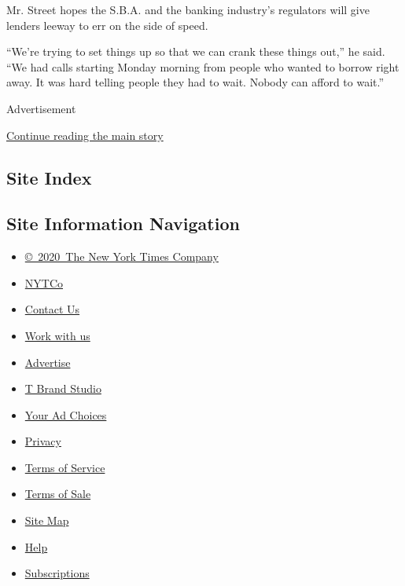 Mr. Street hopes the S.B.A. and the banking industry's regulators will
give lenders leeway to err on the side of speed.

``We're trying to set things up so that we can crank these things out,''
he said. ``We had calls starting Monday morning from people who wanted
to borrow right away. It was hard telling people they had to wait.
Nobody can afford to wait.''

Advertisement

\protect\hyperlink{after-bottom}{Continue reading the main story}

\hypertarget{site-index}{%
\subsection{Site Index}\label{site-index}}

\hypertarget{site-information-navigation}{%
\subsection{Site Information
Navigation}\label{site-information-navigation}}

\begin{itemize}
\tightlist
\item
  \href{https://help.nytimes3xbfgragh.onion/hc/en-us/articles/115014792127-Copyright-notice}{©~2020~The
  New York Times Company}
\end{itemize}

\begin{itemize}
\tightlist
\item
  \href{https://www.nytco.com/}{NYTCo}
\item
  \href{https://help.nytimes3xbfgragh.onion/hc/en-us/articles/115015385887-Contact-Us}{Contact
  Us}
\item
  \href{https://www.nytco.com/careers/}{Work with us}
\item
  \href{https://nytmediakit.com/}{Advertise}
\item
  \href{http://www.tbrandstudio.com/}{T Brand Studio}
\item
  \href{https://www.nytimes3xbfgragh.onion/privacy/cookie-policy\#how-do-i-manage-trackers}{Your
  Ad Choices}
\item
  \href{https://www.nytimes3xbfgragh.onion/privacy}{Privacy}
\item
  \href{https://help.nytimes3xbfgragh.onion/hc/en-us/articles/115014893428-Terms-of-service}{Terms
  of Service}
\item
  \href{https://help.nytimes3xbfgragh.onion/hc/en-us/articles/115014893968-Terms-of-sale}{Terms
  of Sale}
\item
  \href{https://spiderbites.nytimes3xbfgragh.onion}{Site Map}
\item
  \href{https://help.nytimes3xbfgragh.onion/hc/en-us}{Help}
\item
  \href{https://www.nytimes3xbfgragh.onion/subscription?campaignId=37WXW}{Subscriptions}
\end{itemize}

